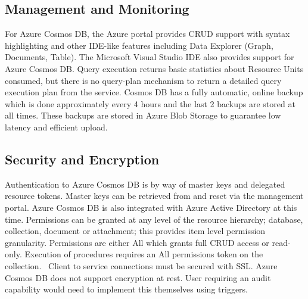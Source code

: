\subsection{Management and Monitoring}
For Azure Cosmos DB, the Azure portal provides CRUD support with
syntax highlighting and other IDE-like features including Data
Explorer (Graph, Documents, Table). The Microsoft Visual Studio IDE
also provides support for Azure Cosmos DB.  Query execution returns
basic statistics about Resource Units consumed, but there is no
query-plan mechanism to return a detailed query execution plan from
the service.  Cosmos DB has a fully automatic, online backup which is
done approximately every 4 hours and the last 2 backups are stored at
all times. These backups are stored in Azure Blob Storage to guarantee
low latency and efficient upload.


\subsection{Security and Encryption}
Authentication to Azure Cosmos DB is by way of master keys and
delegated resource tokens. Master keys can be retrieved from and reset
via the management portal. Azure Cosmos DB is also integrated with
Azure Active Directory at this time.  Permissions can be granted at
any level of the resource hierarchy; database, collection, document or
attachment; this provides item level permission
granularity. Permissions are either All which grants full CRUD access
or read-only. Execution of procedures requires an All permissions
token on the collection.   Client to service connections must be
secured with SSL. Azure Cosmos DB does not support encryption at
rest. User requiring an audit capability would need to implement this
themselves using triggers.

